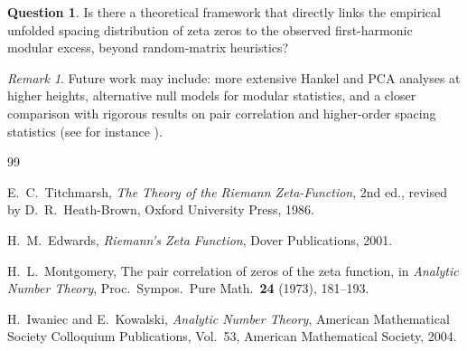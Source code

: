 \documentclass[11pt]{amsart}
\numberwithin{equation}{section}
\theoremstyle{plain}
\theoremstyle{definition}
\newtheorem{question}[theorem]{Question}
\theoremstyle{remark}
\newtheorem{remark}[theorem]{Remark}
\begin{document}
\begin{question}
\label{q:unfolded_spacing_theory}
Is there a theoretical framework that directly links the empirical
unfolded spacing distribution of zeta zeros to the observed
first-harmonic modular excess, beyond random-matrix heuristics?
\end{question}

\begin{remark}
\label{rem:future_work}
Future work may include:
more extensive Hankel and PCA analyses at higher heights,
alternative null models for modular statistics,
and a closer comparison with rigorous results on pair correlation
and higher-order spacing statistics
(see for instance \cite{Montgomery1973,IwaniecKowalski2004}).
\end{remark}

\begin{thebibliography}{99}

E.~C.~Titchmarsh,
\emph{The Theory of the Riemann Zeta-Function},
2nd ed., revised by D.~R.~Heath-Brown,
Oxford University Press, 1986.

H.~M.~Edwards,
\emph{Riemann's Zeta Function},
Dover Publications, 2001.

H.~L.~Montgomery,
The pair correlation of zeros of the zeta function,
in \emph{Analytic Number Theory},
Proc.\ Sympos.\ Pure Math.\ \textbf{24} (1973), 181--193.

H.~Iwaniec and E.~Kowalski,
\emph{Analytic Number Theory},
American Mathematical Society Colloquium Publications, Vol.~53,
American Mathematical Society, 2004.

\end{thebibliography}
\end{document}
